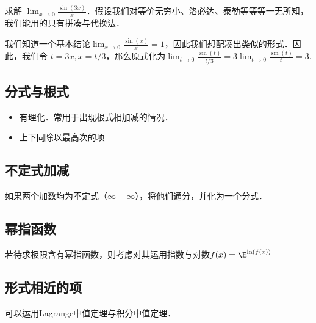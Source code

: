 \begin{example}{}
求解 $\lim_{x \to 0} \frac{\sin(3x)}{x}$．假设我们对等价无穷小、洛必达、泰勒等等等一无所知，我们能用的只有拼凑与代换法．

我们知道一个基本结论$\lim_{x \to 0} \frac{\sin(x)}{x}=1$，因此我们想配凑出类似的形式．因此，我们令 $t=3x, x=t/3$，那么原式化为$\lim_{t \to 0} \frac{\sin(t)}{t/3}=3\lim_{t \to 0} \frac{\sin(t)}{t}=3$.
\end{example}


\subsection{分式与根式}
\begin{itemize}
\item 有理化．常用于出现根式相加减的情况．
\item 上下同除以最高次的项
\end{itemize}

\subsection{不定式加减}
如果两个加数均为不定式（$\infty+\infty$），将他们通分，并化为一个分式．

\subsection{幂指函数}
若待求极限含有幂指函数，则考虑对其运用指数与对数$f(x)=\E^{\ln(f(x))}$

\subsection{形式相近的项}
可以运用Lagrange中值定理与积分中值定理．